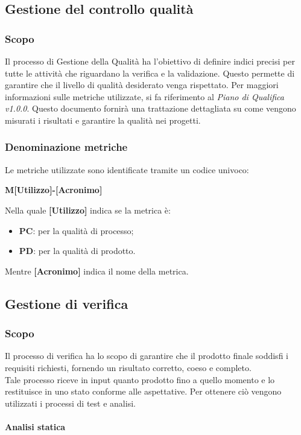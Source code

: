 \subsection{Gestione del controllo qualità}
\subsubsection{Scopo}
Il processo di Gestione della Qualità ha l'obiettivo di definire indici
precisi per tutte le attività che riguardano la verifica e la validazione.
Questo permette di garantire che il livello di qualità desiderato venga
rispettato. Per maggiori informazioni sulle metriche utilizzate,
si fa riferimento al \textit{Piano di Qualifica v1.0.0}.
Questo documento fornirà una trattazione dettagliata su come
vengono misurati i risultati e garantire la qualità nei progetti.
\subsubsection{Denominazione metriche}
Le metriche utilizzate sono identificate tramite un codice univoco:
\begin{center}
    \textbf{M[Utilizzo]-[Acronimo]}
\end{center}
Nella quale \textbf{[Utilizzo]} indica se la metrica è:
\begin{itemize}
    \item \textbf{PC}: per la qualità di processo;
    \item \textbf{PD}:  per la qualità di prodotto.
\end{itemize}
Mentre \textbf{[Acronimo]} indica il nome della metrica.
\subsection{Gestione di verifica}
\subsubsection{Scopo} 
Il processo di verifica ha lo scopo di garantire che il prodotto finale soddisfi i requisiti richiesti, fornendo un risultato corretto, coeso e completo.\\
Tale processo riceve in input quanto prodotto fino a quello momento e lo restituisce in uno stato conforme alle aspettative.
Per ottenere ciò vengono utilizzati i processi di test e analisi.
\paragraph{Analisi statica} ~

